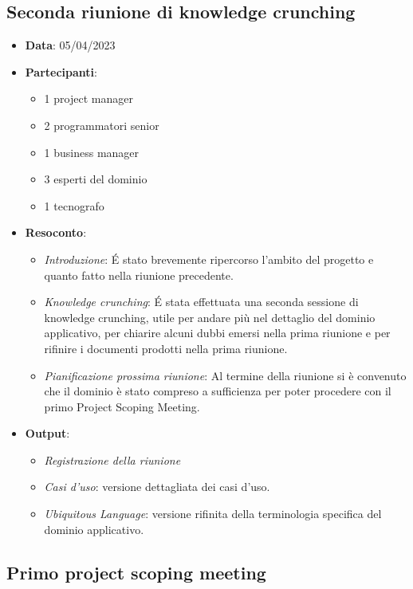 \documentclass{article}
\begin{document}
  \subsection{Seconda riunione di knowledge crunching}
  \begin{itemize}
    \item \textbf{Data}: 05/04/2023
    \item \textbf{Partecipanti}:
    \begin{itemize}
      \item 1 project manager
      \item 2 programmatori senior
      \item 1 business manager
      \item 3 esperti del dominio
      \item 1 tecnografo
    \end{itemize}
    \item \textbf{Resoconto}:
    \begin{itemize}
      \item \emph{Introduzione}: 
        É stato brevemente ripercorso l'ambito del progetto e quanto fatto nella riunione precedente.
      \item \emph{Knowledge crunching}:
        É stata effettuata una seconda sessione di knowledge crunching, utile per andare più nel dettaglio del dominio 
          applicativo, per chiarire alcuni dubbi emersi nella prima riunione e per rifinire i documenti prodotti nella prima riunione.
      \item \emph{Pianificazione prossima riunione}:
        Al termine della riunione si è convenuto che il dominio è stato compreso a sufficienza per poter procedere con il primo Project
        Scoping Meeting.
    \end{itemize}
    \item \textbf{Output}:
    \begin{itemize}
      \item \emph{Registrazione della riunione}
      \item \emph{Casi d'uso}: versione dettagliata dei casi d'uso.
      \item \emph{Ubiquitous Language}: versione rifinita della terminologia specifica del dominio applicativo.
    \end{itemize}
  \end{itemize}

  \subsection{Primo project scoping meeting}
\end{document}
